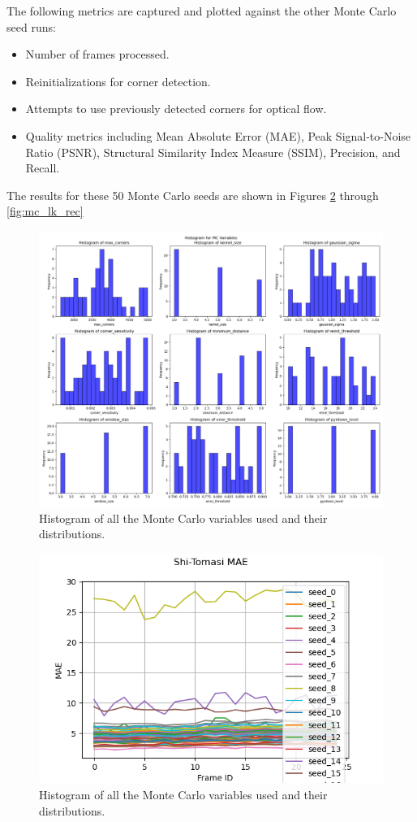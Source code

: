 \documentclass[11pt, conference, letterpaper]{IEEEtran}
\begin{document}
The following metrics are captured and plotted against the other Monte Carlo seed runs:
\begin{itemize}
    \item Number of frames processed.
    \item Reinitializations for corner detection.
    \item Attempts to use previously detected corners for optical flow.
    \item Quality metrics including Mean Absolute Error (MAE), Peak Signal-to-Noise Ratio (PSNR), Structural Similarity Index Measure (SSIM), Precision, and Recall.
\end{itemize}

The results for these 50 Monte Carlo seeds are shown in Figures \ref{fig:mc_stc_mae} through \ref{fig:mc_lk_rec}

\begin{figure}[h]
    \centering
    \includegraphics[width=\linewidth]{mc_images/mc_histogram.png}
    \caption{Histogram of all the Monte Carlo variables used and their distributions.}
    \label{fig:mc_hist}
\end{figure}

\begin{figure}[h]
    \centering
    \includegraphics[width=\linewidth]{mc_images/mc_stc_mae.png}
    \caption{Histogram of all the Monte Carlo variables used and their distributions.}
    \label{fig:mc_stc_mae}
\end{figure}
\end{document}
